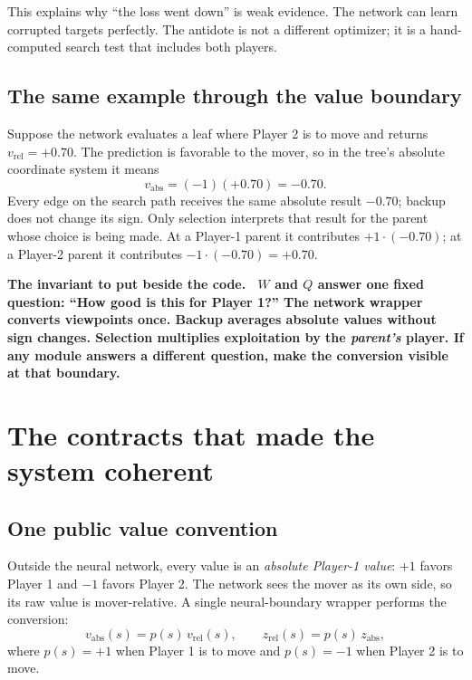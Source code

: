\documentclass[10.5pt,letterpaper]{article}
\newcommand{\boxtitle}[1]{\sffamily\bfseries\color{deepblue}#1.\ }
\begin{document}
This explains why ``the loss went down'' is weak evidence. The network can
learn corrupted targets perfectly. The antidote is not a different optimizer;
it is a hand-computed search test that includes both players.

\subsection{The same example through the value boundary}

Suppose the network evaluates a leaf where Player 2 is to move and returns
$v_{\mathrm{rel}}=+0.70$. The prediction is favorable to the mover, so in the
tree's absolute coordinate system it means
\[
  v_{\mathrm{abs}}=(-1)(+0.70)=-0.70.
\]
Every edge on the search path receives the same absolute result $-0.70$;
backup does not change its sign. Only selection interprets that result for the
parent whose choice is being made. At a Player-1 parent it contributes
$+1\cdot(-0.70)$; at a Player-2 parent it contributes
$-1\cdot(-0.70)=+0.70$.

\begin{keybox}
\boxtitle{The invariant to put beside the code}
$W$ and $Q$ answer one fixed question: ``How good is this for Player 1?''
The network wrapper converts viewpoints once. Backup averages absolute values
without sign changes. Selection multiplies exploitation by the \emph{parent's}
player. If any module answers a different question, make the conversion visible
at that boundary.
\end{keybox}

\section{The contracts that made the system coherent}

\subsection{One public value convention}

Outside the neural network, every value is an \emph{absolute Player-1 value}:
$+1$ favors Player 1 and $-1$ favors Player 2. The network sees the mover as
its own side, so its raw value is mover-relative. A single neural-boundary
wrapper performs the conversion:
\[
  v_{\mathrm{abs}}(s) = p(s)\,v_{\mathrm{rel}}(s),
  \qquad
  z_{\mathrm{rel}}(s) = p(s)\,z_{\mathrm{abs}},
\]
where $p(s)=+1$ when Player 1 is to move and $p(s)=-1$ when Player 2 is to move.
\end{document}
